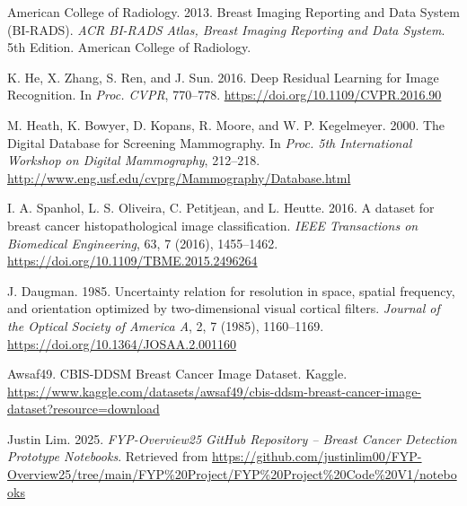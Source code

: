 \documentclass[12pt]{article}
\begin{document}
\begin{thebibliography}{99}
    American College of Radiology. 2013. Breast Imaging Reporting and Data System (BI-RADS). \textit{ACR BI-RADS Atlas, Breast Imaging Reporting and Data System}. 5th Edition. American College of Radiology.

    K. He, X. Zhang, S. Ren, and J. Sun. 2016. Deep Residual Learning for Image Recognition. In \textit{Proc. CVPR}, 770–778. \url{https://doi.org/10.1109/CVPR.2016.90}

    M. Heath, K. Bowyer, D. Kopans, R. Moore, and W. P. Kegelmeyer. 2000. The Digital Database for Screening Mammography. In \textit{Proc. 5th International Workshop on Digital Mammography}, 212–218. \url{http://www.eng.usf.edu/cvprg/Mammography/Database.html}

    I. A. Spanhol, L. S. Oliveira, C. Petitjean, and L. Heutte. 2016. A dataset for breast cancer histopathological image classification. \textit{IEEE Transactions on Biomedical Engineering}, 63, 7 (2016), 1455–1462. \url{https://doi.org/10.1109/TBME.2015.2496264}

    J. Daugman. 1985. Uncertainty relation for resolution in space, spatial frequency, and orientation optimized by two-dimensional visual cortical filters. \textit{Journal of the Optical Society of America A}, 2, 7 (1985), 1160–1169. \url{https://doi.org/10.1364/JOSAA.2.001160}

    Awsaf49. CBIS-DDSM Breast Cancer Image Dataset. Kaggle. \url{https://www.kaggle.com/datasets/awsaf49/cbis-ddsm-breast-cancer-image-dataset?resource=download}

    Justin Lim. 2025. \textit{FYP-Overview25 GitHub Repository – Breast Cancer Detection Prototype Notebooks}. Retrieved from \url{https://github.com/justinlim00/FYP-Overview25/tree/main/FYP%20Project/FYP%20Project%20Code%20V1/notebooks}
    
    \end{thebibliography}
    
\end{document}
